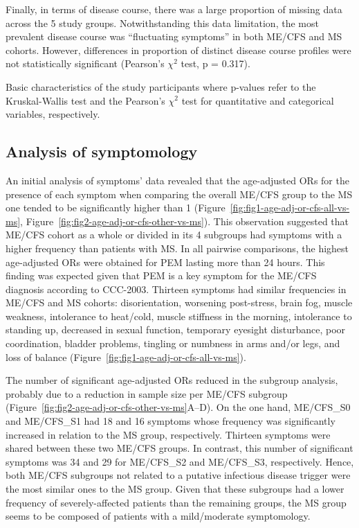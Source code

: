 Finally, in terms of disease course, there was a large proportion of missing data across the 5 study groups. Notwithstanding this data limitation, the most prevalent disease course was ``fluctuating symptoms'' in both ME/CFS and MS cohorts. However, differences in proportion of distinct disease course profiles were not statistically significant (Pearson's $\chi^2$ test, p = 0.317).

\begin{table}[h]
    \centering
    \caption[Basic characteristics of the study participants]{Basic characteristics of the study participants where p-values refer to the Kruskal-Wallis test and the Pearson's $\chi^2$ test for quantitative and categorical variables, respectively.}
    \resizebox{\linewidth}{!}{}
    \label{tab:tab1-basic-characteristics-cfs-ms}
\end{table}

\subsection{Analysis of symptomology}

An initial analysis of symptoms' data revealed that the age-adjusted ORs for the presence of each symptom when comparing the overall ME/CFS group to the MS one tended to be significantly higher than 1 (Figure~\ref{fig:fig1-age-adj-or-cfs-all-vs-ms}, Figure~\ref{fig:fig2-age-adj-or-cfs-other-vs-ms}). This observation suggested that ME/CFS cohort as a whole or divided in its 4 subgroups had symptoms with a higher frequency than patients with MS. In all pairwise comparisons, the highest age-adjusted ORs were obtained for PEM lasting more than 24 hours. This finding was expected given that PEM is a key symptom for the ME/CFS diagnosis according to CCC-2003. Thirteen symptoms had similar frequencies in ME/CFS and MS cohorts: disorientation, worsening post-stress, brain fog, muscle weakness, intolerance to heat/cold, muscle stiffness in the morning, intolerance to standing up, decreased in sexual function, temporary eyesight disturbance, poor coordination, bladder problems, tingling or numbness in arms and/or legs, and loss of balance (Figure~\ref{fig:fig1-age-adj-or-cfs-all-vs-ms}).

The number of significant age-adjusted ORs reduced in the subgroup analysis, probably due to a reduction in sample size per ME/CFS subgroup (Figure~\ref{fig:fig2-age-adj-or-cfs-other-vs-ms}A–D). On the one hand, ME/CFS\_S0 and ME/CFS\_S1 had 18 and 16 symptoms whose frequency was significantly increased in relation to the MS group, respectively. Thirteen symptoms were shared between these two ME/CFS groups. In contrast, this number of significant symptoms was 34 and 29 for ME/CFS\_S2 and ME/CFS\_S3, respectively. Hence, both ME/CFS subgroups not related to a putative infectious disease trigger were the most similar ones to the MS group. Given that these subgroups had a lower frequency of severely-affected patients than the remaining groups, the MS group seems to be composed of patients with a mild/moderate symptomology.

